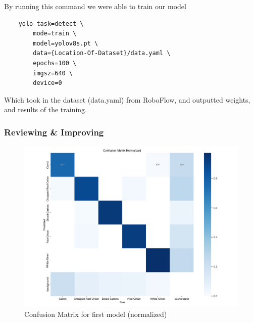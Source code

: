 \documentclass{article}
\begin{document}
    By running this command we were able to train our model
    \begin{verbatim}
    yolo task=detect \
        mode=train \
        model=yolov8s.pt \
        data={Location-Of-Dataset}/data.yaml \
        epochs=100 \
        imgsz=640 \
        device=0
    \end{verbatim}


    Which took in the dataset (data.yaml) from RoboFlow, and outputted weights, and results of the training.


    \subsubsection{Reviewing \& Improving}


    \begin{figure}[htbp]
        \begin{minipage}[htbp]{1\linewidth}
            \centering
            \includegraphics[width=\linewidth]{assets/confusion_matrix_normalized-Version-1.png}
            \caption{Confusion Matrix for first model (normalized)}
        \end{minipage}%
        

\end{figure}
\end{document}
